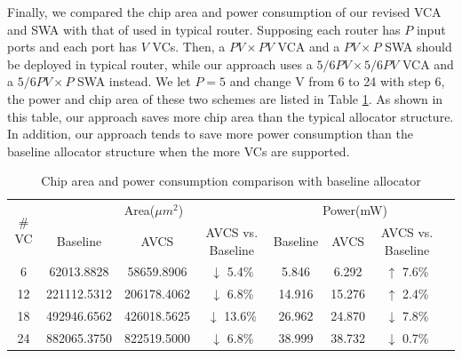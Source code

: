 \documentclass[10pt,conference]{IEEEtran}
\begin{document}
Finally, we compared the chip area and power consumption of our revised VCA and SWA with that of used in typical router. Supposing each router has $P$ input ports and each port has $V$ VCs. Then, a $PV\times PV$ VCA and a $PV\times P$ SWA should be deployed in typical router, while our approach uses a $5/6PV\times 5/6PV$ VCA and a $5/6PV\times P$ SWA instead. We let $P=5$ and change V from 6 to 24 with step 6, the power and chip area of these two schemes are listed in Table \ref{alloccost}. As shown in this table, our approach saves more chip area than the typical allocator structure. In addition, our approach tends to save more power consumption than the baseline allocator structure when the more VCs are supported.

\begin{table}
\centering\caption{Chip area and power consumption comparison with baseline allocator}\label{alloccost}
\begin{tabular}{|c|c|c|c|c|c|c|c|}
\hline
\multirow{2}{*}{$\#$VC} & \multicolumn{3}{|c|}{Area($\mu m^2$)} & \multicolumn{3}{|c|}{Power(mW)}\\
\cline{2-7}
& Baseline & AVCS & AVCS vs. Baseline & Baseline & AVCS & AVCS vs. Baseline\\
\hline
6 & 62013.8828 & 58659.8906 & $\downarrow$ 5.4\% & 5.846 & 6.292 & $\uparrow$ 7.6\%\\
\hline
12 & 221112.5312 & 206178.4062 & $\downarrow$ 6.8\% & 14.916 & 15.276 & $\uparrow$ 2.4\%\\
\hline
18 & 492946.6562 & 426018.5625 & $\downarrow$ 13.6\% & 26.962 & 24.870 & $\downarrow$ 7.8\%\\
\hline
24 & 882065.3750 & 822519.5000 & $\downarrow$ 6.8\% & 38.999 & 38.732 & $\downarrow$ 0.7\%\\
\hline
\end{tabular}
\end{table}
\end{document}

